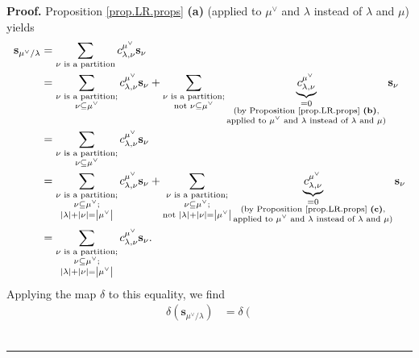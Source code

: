 \documentclass[numbers=enddot,12pt,final,onecolumn,notitlepage]{scrartcl}%
\theoremstyle{definition}
\newenvironment{proof}[1][Proof]{\noindent\textbf{#1.} }{\ \rule{0.5em}{0.5em}}
\let\sumnonlimits\sum
\renewcommand{\sum}{\sumnonlimits\limits}
\begin{document}
\begin{proof}
Proposition \ref{prop.LR.props} \textbf{(a)} (applied to $\mu^{\vee}$ and
$\lambda$ instead of $\lambda$ and $\mu$) yields
\begin{align*}
\mathbf{s}_{\mu^{\vee}/\lambda}  &  =\sum_{\nu\text{ is a partition}%
}c_{\lambda,\nu}^{\mu^{\vee}}\mathbf{s}_{\nu}\\
&  =\sum_{\substack{\nu\text{ is a partition;}\\\nu\subseteq\mu^{\vee}%
}}c_{\lambda,\nu}^{\mu^{\vee}}\mathbf{s}_{\nu}+\sum_{\substack{\nu\text{ is a
partition;}\\\text{not }\nu\subseteq\mu^{\vee}}}\underbrace{c_{\lambda,\nu
}^{\mu^{\vee}}}_{\substack{=0\\\text{(by Proposition \ref{prop.LR.props}
\textbf{(b)},}\\\text{applied to }\mu^{\vee}\text{ and }\lambda\text{ instead
of }\lambda\text{ and }\mu\text{)}}}\mathbf{s}_{\nu}\\
&  =\sum_{\substack{\nu\text{ is a partition;}\\\nu\subseteq\mu^{\vee}%
}}c_{\lambda,\nu}^{\mu^{\vee}}\mathbf{s}_{\nu}\\
&  =\sum_{\substack{\nu\text{ is a partition;}\\\nu\subseteq\mu^{\vee
};\\\left\vert \lambda\right\vert +\left\vert \nu\right\vert =\left\vert
\mu^{\vee}\right\vert }}c_{\lambda,\nu}^{\mu^{\vee}}\mathbf{s}_{\nu}%
+\sum_{\substack{\nu\text{ is a partition;}\\\nu\subseteq\mu^{\vee
};\\\text{not }\left\vert \lambda\right\vert +\left\vert \nu\right\vert
=\left\vert \mu^{\vee}\right\vert }}\underbrace{c_{\lambda,\nu}^{\mu^{\vee}}%
}_{\substack{=0\\\text{(by Proposition \ref{prop.LR.props} \textbf{(c)}%
,}\\\text{applied to }\mu^{\vee}\text{ and }\lambda\text{ instead of }%
\lambda\text{ and }\mu\text{)}}}\mathbf{s}_{\nu}\\
&  =\sum_{\substack{\nu\text{ is a partition;}\\\nu\subseteq\mu^{\vee
};\\\left\vert \lambda\right\vert +\left\vert \nu\right\vert =\left\vert
\mu^{\vee}\right\vert }}c_{\lambda,\nu}^{\mu^{\vee}}\mathbf{s}_{\nu}.
\end{align*}
Applying the map $\delta$ to this equality, we find%
\begin{align*}
\delta\left(  \mathbf{s}_{\mu^{\vee}/\lambda}\right)   &  =\delta\left(

\end{align*}
\end{proof}
\end{document}
